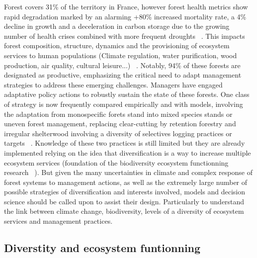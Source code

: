 \documentclass{article}
\begin{document}
Forest covers 31\% of the territory in France, however forest health metrics show rapid degradation  marked by an alarming +80\% increased mortality rate, a 4\% decline in growth and a deceleration in carbon storage due to the growing number of health crises combined with more frequent droughts ~\autocite{IGN}. This impacts forest composition, structure, dynamics and the provisioning of ecosystem services to human populations (Climate regulation, water purification, wood production, air quality, cultural leisure...) ~\autocite{grammatikopoulouValueForestEcosystem2021}. Notably, 94\% of these forests are designated as productive, emphasizing the critical need to adapt management strategies to address these emerging challenges. Managers have engaged adaptative policy actions to robustly sustain the state of these forests. One class of strategy is now frequently compared empirically and with models, involving the adaptation from monospecific forets stand into mixed species stands or uneven forest management, replacing clear-cutting by retention forestry and irregular shelterwood involving a diversity of selectives logging practices or targets  ~\autocite{raymondIrregularShelterwoodSystem2009}. Knowledge of these two practices is still limited but they are already implemented relying on the idea that diversification is a way to increase multiple ecosystem services (foundation of the biodiversity ecosystem functionning research ~\autocite{tilmanBiodiversityPopulationEcosystem1996}). But given the many uncertainties in climate and complex response of forest systems to management actions, as well as the extremely large number of possible strategies of diversification and interests involved, models and decision science should be called upon to assist their design. Particularly to understand the link between climate change, biodiversity, levels of a diversity of ecosystem services and management practices. \\

\subsection{Diverstity and ecosystem funtionning}
\end{document}
